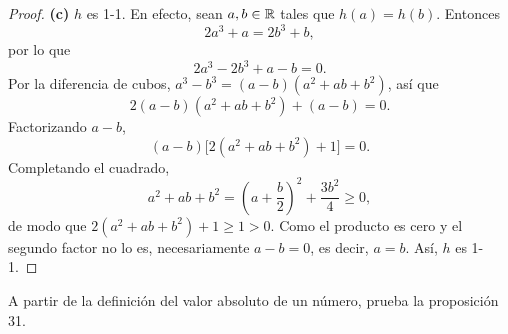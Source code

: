 \documentclass[12pt,a4paper]{article}
\begin{document}
\begin{proof}
        \textbf{(c)} $h$ es 1-1. En efecto, sean $a,b\in\mathbb{R}$ tales que $h(a)=h(b)$. Entonces
        \begin{equation*}
            2a^{3}+a=2b^{3}+b,
        \end{equation*}
        por lo que
        \begin{equation*}
            2a^{3}-2b^{3}+a-b=0.
        \end{equation*}
        Por la diferencia de cubos, $a^{3}-b^{3}=(a-b)(a^{2}+ab+b^{2})$, así que
        \begin{equation*}
            2(a-b)(a^{2}+ab+b^{2})+(a-b)=0.
        \end{equation*}
        Factorizando $a-b$,
        \begin{equation*}
            (a-b)\bigl[2(a^{2}+ab+b^{2})+1\bigr]=0.
        \end{equation*}
        Completando el cuadrado,
        \begin{equation*}
            a^{2}+ab+b^{2}=\left(a+\frac{b}{2}\right)^{2}+\frac{3b^{2}}{4}\geq0,
        \end{equation*}
        de modo que $2(a^{2}+ab+b^{2})+1\geq1>0$. Como el producto es cero y el segundo factor no lo es, necesariamente $a-b=0$, es decir, $a=b$. Así, $h$ es 1-1.
    \end{proof}

    \begin{problema}
        A partir de la definición del valor absoluto de un número, prueba la proposición 31.
    \end{problema}
\end{document}
